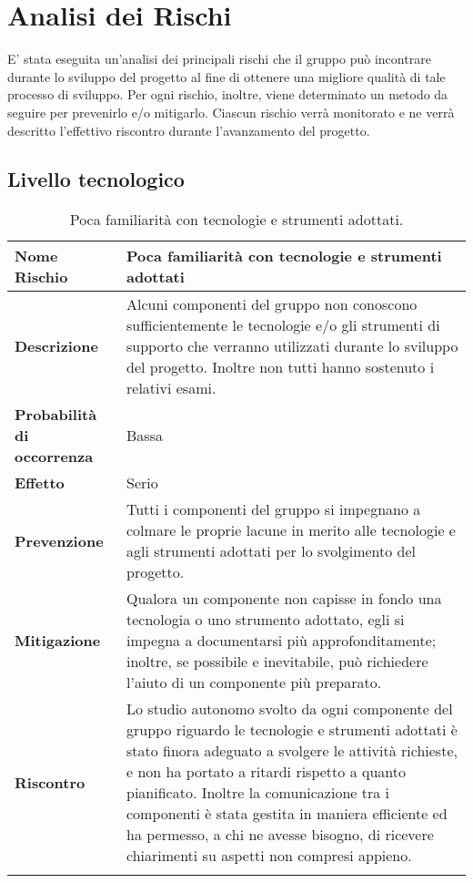 \documentclass[../PianoDiProgetto.tex]{subfiles}
\begin{document}
	\section{Analisi dei Rischi}
	E' stata eseguita un'analisi dei principali rischi che il gruppo può incontrare
	durante lo sviluppo del progetto al fine di ottenere una migliore qualità di tale
	processo di sviluppo. Per ogni rischio, inoltre, viene determinato un metodo
	da seguire per prevenirlo e/o mitigarlo. Ciascun rischio verrà monitorato e ne
	verrà descritto l'effettivo riscontro durante l'avanzamento del progetto.
		\subsection{Livello tecnologico}
			\begin{table}[H]
				\center
				\begin{tabularx}{\textwidth}{X X}
					\noalign{\hrule height 1.5pt}
					\textbf{Nome Rischio} & Poca familiarità con tecnologie e strumenti adottati \\
					\hline
					\textbf{Descrizione}  & Alcuni componenti del gruppo non conoscono
					sufficientemente le tecnologie e/o gli strumenti
					di supporto che verranno utilizzati durante lo
					sviluppo del progetto. Inoltre non tutti hanno
					sostenuto i relativi esami.  \\
					\hline
					\textbf{Probabilità di occorrenza}  & Bassa  \\
					\hline
					\textbf{Effetto}  & Serio  \\
					\hline
					\textbf{Prevenzione}  & Tutti i componenti del gruppo si impegnano a
					colmare le proprie lacune in merito alle
					tecnologie e agli strumenti adottati per lo
					svolgimento del progetto.  \\
					\hline
					\textbf{Mitigazione}  & Qualora un componente non capisse in fondo una
tecnologia o uno strumento adottato, egli si impegna a documentarsi più approfonditamente;
inoltre, se possibile e inevitabile, può richiedere
l'aiuto di un componente più preparato. \\
					\hline
					\textbf{Riscontro} & Lo studio autonomo svolto da ogni componente del gruppo riguardo le tecnologie e strumenti adottati è stato finora adeguato a svolgere le attività richieste, e non ha portato a ritardi rispetto a quanto pianificato. Inoltre la comunicazione tra i componenti è stata gestita in maniera efficiente ed ha permesso, a chi ne avesse bisogno, di ricevere chiarimenti su aspetti non compresi appieno. \\
					\noalign{\hrule height 1.5pt}
			\end{tabularx}
			\caption{Poca familiarità con tecnologie e strumenti adottati. \label{tab:table_label}}
		\end{table}
		
\end{document}
